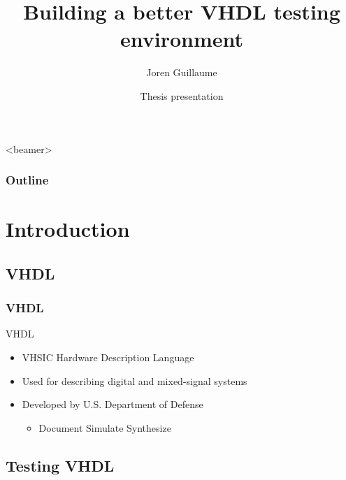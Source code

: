 \documentclass[british,10pt]{beamer}
\title{Building a better VHDL testing environment}
\author[J. Guillaume]{Joren Guillaume}
\date[JAN'15, Gent]{Thesis presentation}
\institute[Ghent University]
{
  FEA\\
  Ghent University
}
\begin{document}
\begin{frame}[plain]
  \titlepage
\end{frame}



\begin{frame}<beamer>\frametitle{Outline}
  \tableofcontents
\end{frame}

\section{Introduction}
\subsection{VHDL}

\begin{frame}\frametitle{VHDL}
VHDL
\begin{itemize}
\item VHSIC Hardware Description Language
\item Used for describing digital and mixed-signal systems 
\item Developed by U.S. Department of Defense
\begin{itemize}
\item Document  Simulate  Synthesize
\end{itemize}
\end{itemize}
\end{frame}

\subsection{Testing VHDL}
\end{document}
